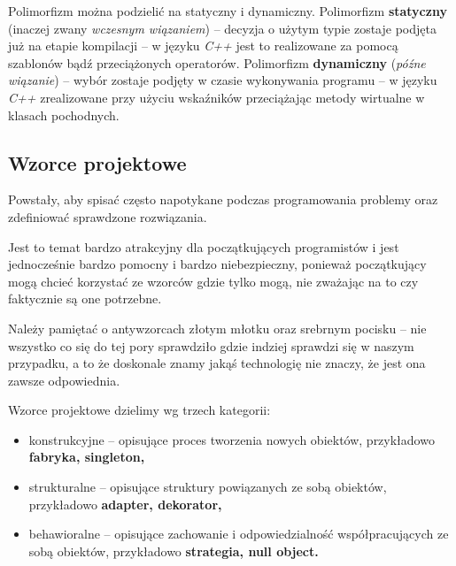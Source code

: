 Polimorfizm można podzielić na statyczny i dynamiczny. Polimorfizm \textbf{statyczny} (inaczej zwany \textit{wczesnym wiązaniem}) -- decyzja o użytym typie zostaje podjęta już na etapie kompilacji -- w języku \textit{C++} jest to realizowane za pomocą szablonów bądź przeciążonych operatorów.  Polimorfizm \textbf{dynamiczny} (\textit{późne wiązanie}) -- wybór zostaje podjęty w czasie wykonywania programu -- w języku \textit{C++} zrealizowane przy użyciu wskaźników przeciążając metody wirtualne w klasach pochodnych.

\subsection{Wzorce projektowe}
Powstały, aby spisać często napotykane podczas programowania problemy oraz zdefiniować sprawdzone rozwiązania.

Jest to temat bardzo atrakcyjny dla początkujących programistów i jest jednocześnie bardzo pomocny i bardzo niebezpieczny, ponieważ początkujący mogą chcieć korzystać ze wzorców gdzie tylko mogą, nie zważając na to czy faktycznie są one potrzebne.

Należy pamiętać o antywzorcach złotym młotku oraz srebrnym pocisku -- nie wszystko co się do tej pory sprawdziło gdzie indziej sprawdzi się w naszym przypadku, a to że doskonale znamy jakąś technologię nie znaczy, że jest ona zawsze odpowiednia.

Wzorce projektowe dzielimy wg trzech kategorii:
\begin{itemize}
	\setlength\itemsep{1pt}
	\item{konstrukcyjne -- opisujące proces tworzenia nowych obiektów, przykładowo \textbf{fabryka, singleton,}}
	\item{strukturalne -- opisujące struktury powiązanych ze sobą obiektów, przykładowo \textbf{adapter, dekorator,}}
	\item{behawioralne -- opisujące zachowanie i odpowiedzialność współpracujących ze sobą obiektów, przykładowo \textbf{strategia, null object.}}
\end{itemize}